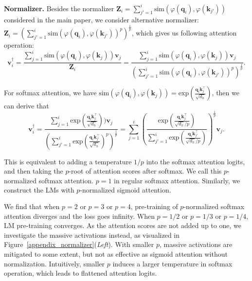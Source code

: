 \documentclass{article} \usepackage{iclr2025_conference,times}
\begin{document}
\textbf{Normalizer.} Besides the normalizer $\boldsymbol{Z}_i=\sum_{j'=1}^i\textrm{sim}(\varphi(\boldsymbol{q}_i)\textrm{,}\,\varphi(\boldsymbol{k}_{j'}))$ considered in the main paper, we consider alternative normalizer: $\boldsymbol{Z}_i=\left(\sum_{j'=1}^i\textrm{sim}(\varphi(\boldsymbol{q}_i)\textrm{,}\,\varphi(\boldsymbol{k}_{j'}))^p\right)^{\frac{1}{p}}$, which gives us following attention operation: 
\begin{equation}
\boldsymbol{v}_i^{\dagger}=\frac{\sum_{j=1}^i\textrm{sim}(\varphi(\boldsymbol{q}_i)\textrm{,}\,\varphi(\boldsymbol{k}_j))\boldsymbol{v}_j}{\boldsymbol{Z}_i}=\frac{\sum_{j=1}^i\textrm{sim}(\varphi(\boldsymbol{q}_i)\textrm{,}\,\varphi(\boldsymbol{k}_j))\boldsymbol{v}_j}{\left(\sum_{j'=1}^i\textrm{sim}(\varphi(\boldsymbol{q}_i)\textrm{,}\,\varphi(\boldsymbol{k}_{j'}))^p\right)^{\frac{1}{p}}}\textrm{.}
\end{equation}


For softmax attention, we have $\textrm{sim}(\varphi(\boldsymbol{q}_i)\textrm{,}\,\varphi(\boldsymbol{k}_j))=\textrm{exp}(\frac{\boldsymbol{q}_i\boldsymbol{k}_j^\top}{\sqrt{d_h}})$, then we can derive that
\begin{equation}
    \boldsymbol{v}_i^{\dagger}=\frac{\sum_{j=1}^i\textrm{exp}(\frac{\boldsymbol{q}_i\boldsymbol{k}_j^\top}{\sqrt{d_h}}))\boldsymbol{v}_j}{\left(\sum_{j'=1}^i\textrm{exp}(\frac{\boldsymbol{q}_i\boldsymbol{k}_{j'}^\top}{\sqrt{d_h}})^p\right)^{\frac{1}{p}}}=\sum_{j=1}^i \left(\frac{\textrm{exp}(\frac{\boldsymbol{q}_i\boldsymbol{k}_j^\top}{\sqrt{d_h}/p})}{\sum_{j'=1}^i\textrm{exp}(\frac{\boldsymbol{q}_i\boldsymbol{k}_{j'}^\top}{\sqrt{d_h}/p})}\right)^{\frac{1}{p}}\boldsymbol{v}_j\textrm{.}
\end{equation}

This is equivalent to adding a temperature $1/p$ into the softmax attention logits, and then taking the $p$-root of attention scores after softmax. We call this $p$-normalized softmax attention. $p=\textrm{1}$ in regular softmax attention. Similarly, we construct the LMs with $p$-normalized sigmoid attention. 

We find that when $p=2$ or $p=3$ or $p=4$, pre-training of $p$-normalized softmax attention diverges and the loss goes infinity. When $p=1/2$ or $p=1/3$ or $p=1/4$, LM pre-training converges. As the attention scores are not added up to one, we investigate the massive activations instead, as visualized in Figure~\ref{appendix_normalizer}(\emph{Left}). With smaller $p$, massive activations are mitigated to some extent, but not as effective as sigmoid attention without normalization. Intuitively, smaller $p$ induces a larger temperature in softmax operation, which leads to flattened attention logits. 
\end{document}
